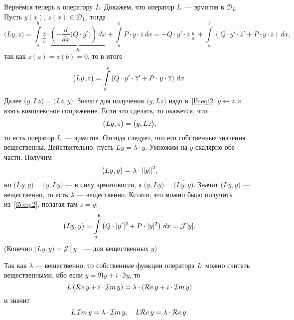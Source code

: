 \documentclass[12pt,a4paper,openany,fleqn]{book}
\newcommand{\J}{\ensuremath{\mathcal{J}}}
\newcommand{\mc}[1]{\ensuremath{\mathcal{#1}}}
\newcommand{\der}[2]{\ensuremath{\frac{d#1}{d#2}}}
\newcommand{\LL}{\ensuremath{L}}
\newcommand{\norm}[1]{\ensuremath{\|#1\|}}
\theoremstyle{definition}
\begin{document}
\noindent Вернёмся теперь к оператору $\LL$. Докажем, что оператор \LL\ --- эрмитов в $\mc{D}_{\LL}$. Пусть $y(x),\,z(x)\in\mc{D}_{\LL}$, тогда
\begin{equation*}
	\big(\LL y,z\big)=\int\limits_a^b \underbrace{\overline{z}}_{v}\cdot\underbrace{\left(-\der{}{x}\Big(Q\cdot y'\Big)\right)\,dx}_{du}+\int\limits_a^b P\cdot y\cdot\overline{z}\,dx=-Q\cdot y'\cdot\overline{z}\mathop{\Big|}\limits_a^b+\int\limits_a^b\left(Q\cdot y'\cdot\overline{z}'+P\cdot y\cdot\overline{z}\right)\,dx,
\end{equation*}
так как $z(a)=z(b)=0$, то в итоге 
\begin{equation}
	\label{l5:eq:2}
	\hfill\big(\LL y,z\big)=\int\limits_a^b\left(Q\cdot y'\cdot\overline{z}'+P\cdot y\cdot\overline{z}\right)\,dx.\hfill
\end{equation}
Далее $\big(y,\LL z\big)=\overline{\big(\LL z,y\big)}$. Значит для получения $\big(y,\LL z\big)$ надо в~\eqref{l5:eq:2} $y\leftrightarrow z$ и взять комплексное сопряжение. Если это сделать, то окажется, что
\begin{equation*}
	\hfill\big(\LL y,z\big)=\big(y,\LL z\big),\hfill
\end{equation*} 
то есть оператор \LL\ --- эрмитов. Отсюда следует, что его собственные значения вещественны. Действительно, пусть $\LL y=\lambda\cdot y$. Умножим на $y$ скалярно обе части. Получим
\begin{equation*}
	\hfill\big(\LL y,y\big)=\lambda\cdot{\norm{y}}^2,\hfill
\end{equation*}
но $\big(\LL y,y\big)=\big(y,\LL y\big)$ --- в силу эрмитовости, а $\big(y,\LL y\big)=\overline{\big(\LL y,y\big)}$. Значит $\big(\LL y,y\big)$ --- вещественно, то есть $\lambda$ --- вещественно. Кстати, это можно было получить из~\eqref{l5:eq:2}, полагая там $z=y$:
\begin{equation}
	\label{l5:eq:3}
	\hfill \big(\LL y,y\big)=\int\limits_a^b\left(Q\cdot|y'|^2+P\cdot|y|^2\right)\,dx=\J[y].\hfill
\end{equation}
(Конечно $\big(\LL y,y\big)=\J[y]$ --- для вещественных $y$)

Так как $\lambda$ --- вещественно, то собственные функции оператора \LL\ можно считать вещественными, ибо если $y=\Re y+i\cdot\Im y$, то 
\begin{equation*}
	\hfill\LL\left(\Re y+i\cdot\Im y\right)=\lambda\cdot\left(\Re y+i\cdot\Im y\right)\hfill
\end{equation*} 
и значит 
\begin{equation*}
	\hfill\LL\,\Im y=\lambda\cdot\Im y,\quad\LL\Re y=\lambda\cdot\Re y.\hfill
\end{equation*}
\end{document}
